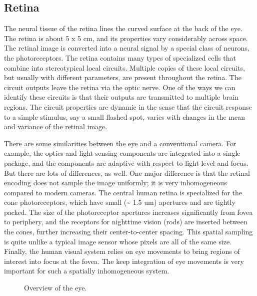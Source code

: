 \documentclass[
  letterpaper,
]{book}
\begin{document}
\subsection{Retina}\label{retina}

The neural tissue of the retina lines the curved surface at the back of
the eye. The retina is about 5 x 5 cm, and its properties vary
considerably across space. The retinal image is converted into a neural
signal by a special class of neurons, the photoreceptors. The retina
contains many types of specialized cells that combine into stereotypical
local circuits. Multiple copies of these local circuits, but usually
with different parameters, are present throughout the retina. The
circuit outputs leave the retina via the optic nerve. One of the ways we
can identify these circuits is that their outputs are transmitted to
multiple brain regions. The circuit properties are dynamic in the sense
that the circuit response to a simple stimulus, say a small flashed
spot, varies with changes in the mean and variance of the retinal image.

There are some similarities between the eye and a conventional camera.
For example, the optics and light sensing components are integrated into
a single package, and the components are adaptive with respect to light
level and focus. But there are lots of differences, as well. One major
difference is that the retinal encoding does not sample the image
uniformly; it is very inhomogeneous compared to modern cameras. The
central human retina is specialized for the cone photoreceptors, which
have small (\textasciitilde{} 1.5 um) apertures and are tightly packed.
The size of the photoreceptor apertures increases significantly from
fovea to periphery, and the receptors for nighttime vision (rods) are
inserted between the cones, further increasing their center-to-center
spacing. This spatial sampling is quite unlike a typical image sensor
whose pixels are all of the same size. Finally, the human visual system
relies on eye movements to bring regions of interest into focus at the
fovea. The keep integration of eye movements is very important for such
a spatially inhomogeneous system.

\begin{figure}


\caption{\label{fig-retina-color}Overview of the eye.}

\end{figure}%
\end{document}

